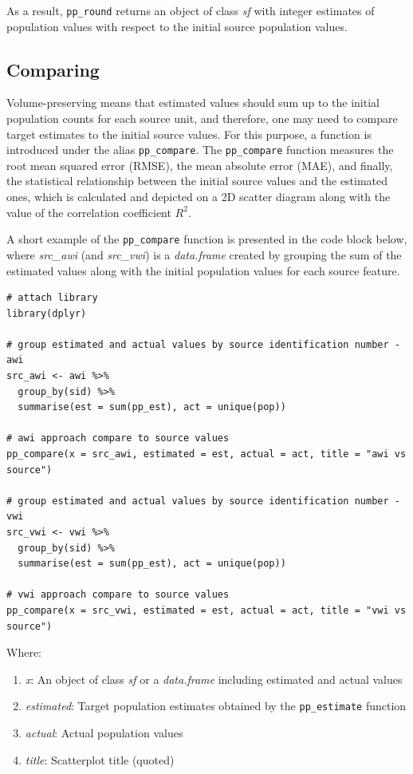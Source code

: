 As a result, \texttt{pp\_round} returns an object of class \emph{sf} with integer estimates of population values
with respect to the initial source population values.

\hypertarget{comparing}{%
\subsection{Comparing}\label{comparing}}

Volume-preserving means that estimated values should sum up to the initial population counts for each source unit, and therefore, one may need to compare target estimates to the initial source values. For this purpose, a function is introduced under the alias \texttt{pp\_compare}. The \texttt{pp\_compare} function measures the root mean squared error (RMSE), the mean absolute error (MAE), and finally, the statistical relationship between the initial source values and the estimated ones, which is calculated and depicted on a 2D scatter diagram along with the value of the correlation coefficient \(R^2\).

A short example of the \texttt{pp\_compare} function is presented in the code block below, where \emph{src\_awi} (and \emph{src\_vwi}) is a \emph{data.frame} created by grouping the sum of the estimated values along with the initial population values for each source feature.

\begin{verbatim}
# attach library
library(dplyr)

# group estimated and actual values by source identification number - awi
src_awi <- awi %>%
  group_by(sid) %>%
  summarise(est = sum(pp_est), act = unique(pop))

# awi approach compare to source values
pp_compare(x = src_awi, estimated = est, actual = act, title = "awi vs source")

# group estimated and actual values by source identification number - vwi
src_vwi <- vwi %>%
  group_by(sid) %>%
  summarise(est = sum(pp_est), act = unique(pop))

# vwi approach compare to source values
pp_compare(x = src_vwi, estimated = est, actual = act, title = "vwi vs source")
\end{verbatim}

Where:

\begin{enumerate}
\def\labelenumi{\arabic{enumi}.}
\tightlist
\item
  \emph{x}: An object of class \emph{sf} or a \emph{data.frame} including estimated and actual values
\item
  \emph{estimated}: Target population estimates obtained by the \texttt{pp\_estimate} function
\item
  \emph{actual}: Actual population values
\item
  \emph{title}: Scatterplot title (quoted)
\end{enumerate}

